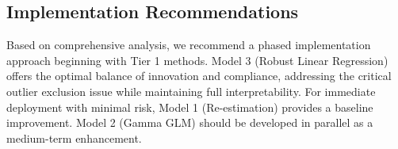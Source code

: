 
\subsection{Implementation Recommendations}

Based on comprehensive analysis, we recommend a phased implementation approach beginning with Tier 1 methods. Model 3 (Robust Linear Regression) offers the optimal balance of innovation and compliance, addressing the critical outlier exclusion issue while maintaining full interpretability. For immediate deployment with minimal risk, Model 1 (Re-estimation) provides a baseline improvement. Model 2 (Gamma GLM) should be developed in parallel as a medium-term enhancement.

